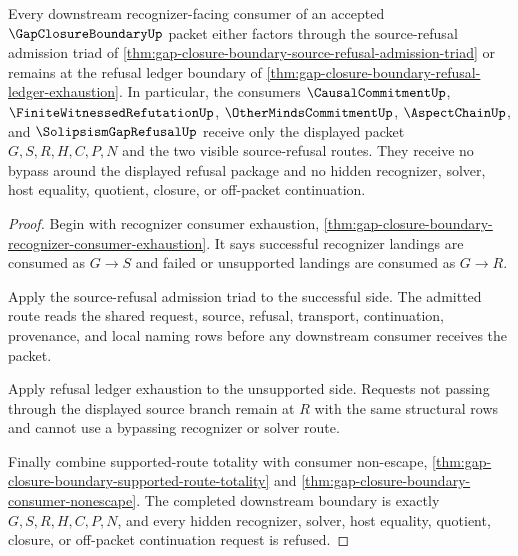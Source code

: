 \begin{theorem}
\label{thm:gap-closure-boundary-downstream-consumer-boundary}
Every downstream recognizer-facing consumer of an accepted $\GapClosureBoundaryUp$ packet either factors through the source-refusal admission triad of \autoref{thm:gap-closure-boundary-source-refusal-admission-triad} or remains at the refusal ledger boundary of \autoref{thm:gap-closure-boundary-refusal-ledger-exhaustion}. In particular, the consumers $\CausalCommitmentUp$, $\FiniteWitnessedRefutationUp$, $\OtherMindsCommitmentUp$, $\AspectChainUp$, and $\SolipsismGapRefusalUp$ receive only the displayed packet $G,S,R,H,C,P,N$ and the two visible source-refusal routes. They receive no bypass around the displayed refusal package and no hidden recognizer, solver, host equality, quotient, closure, or off-packet continuation.
\end{theorem}
\begin{proof}
Begin with recognizer consumer exhaustion, \autoref{thm:gap-closure-boundary-recognizer-consumer-exhaustion}. It says successful recognizer landings are consumed as $G \longrightarrow S$ and failed or unsupported landings are consumed as $G \longrightarrow R$.

Apply the source-refusal admission triad to the successful side. The admitted route reads the shared request, source, refusal, transport, continuation, provenance, and local naming rows before any downstream consumer receives the packet.

Apply refusal ledger exhaustion to the unsupported side. Requests not passing through the displayed source branch remain at $R$ with the same structural rows and cannot use a bypassing recognizer or solver route.

Finally combine supported-route totality with consumer non-escape, \autoref{thm:gap-closure-boundary-supported-route-totality} and \autoref{thm:gap-closure-boundary-consumer-nonescape}. The completed downstream boundary is exactly $G,S,R,H,C,P,N$, and every hidden recognizer, solver, host equality, quotient, closure, or off-packet continuation request is refused.
\end{proof}
